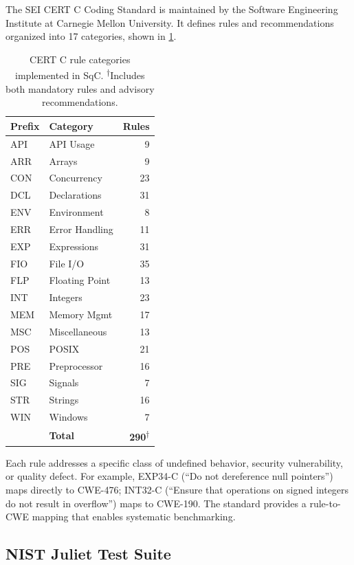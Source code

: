 \documentclass[10pt,twocolumn,letterpaper]{article}
\begin{document}
The SEI CERT C Coding Standard is maintained by the Software
Engineering Institute at Carnegie Mellon University.  It defines rules
and recommendations organized into 17 categories, shown in
\cref{tab:cert-categories}.

\begin{table}[t]
\centering
\footnotesize
\begin{tabular}{@{}llr@{}}
\toprule
\textbf{Prefix} & \textbf{Category} & \textbf{Rules} \\
\midrule
API & API Usage & 9 \\
ARR & Arrays & 9 \\
CON & Concurrency & 23 \\
DCL & Declarations & 31 \\
ENV & Environment & 8 \\
ERR & Error Handling & 11 \\
EXP & Expressions & 31 \\
FIO & File I/O & 35 \\
FLP & Floating Point & 13 \\
INT & Integers & 23 \\
MEM & Memory Mgmt & 17 \\
MSC & Miscellaneous & 13 \\
POS & POSIX & 21 \\
PRE & Preprocessor & 16 \\
SIG & Signals & 7 \\
STR & Strings & 16 \\
WIN & Windows & 7 \\
\midrule
& \textbf{Total} & \textbf{290}\textsuperscript{$\dagger$} \\
\bottomrule
\end{tabular}
\caption{CERT C rule categories implemented in SqC.
\textsuperscript{$\dagger$}Includes both mandatory rules and advisory
recommendations.}
\label{tab:cert-categories}
\end{table}

Each rule addresses a specific class of undefined behavior, security
vulnerability, or quality defect.  For example, EXP34-C (``Do not
dereference null pointers'') maps directly to CWE-476; INT32-C
(``Ensure that operations on signed integers do not result in
overflow'') maps to CWE-190.  The standard provides a rule-to-CWE
mapping that enables systematic benchmarking.

\subsection{NIST Juliet Test Suite}
\end{document}
